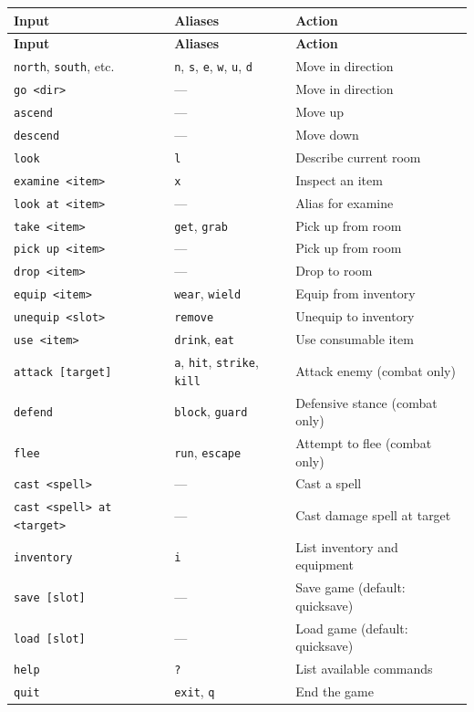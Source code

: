 \documentclass[a4paper,10pt]{article}
\newcommand{\cmd}[1]{\texttt{#1}}
\begin{document}
\begin{longtable}{@{}llp{6cm}@{}}
\toprule
\textbf{Input} & \textbf{Aliases} & \textbf{Action} \\
\midrule
\endfirsthead
\toprule
\textbf{Input} & \textbf{Aliases} & \textbf{Action} \\
\midrule
\endhead
\cmd{north}, \cmd{south}, etc. & \cmd{n}, \cmd{s}, \cmd{e}, \cmd{w}, \cmd{u}, \cmd{d} & Move in direction \\
\cmd{go <dir>}         & ---                        & Move in direction \\
\cmd{ascend}           & ---                        & Move up \\
\cmd{descend}          & ---                        & Move down \\
\cmd{look}             & \cmd{l}                    & Describe current room \\
\cmd{examine <item>}   & \cmd{x}                    & Inspect an item \\
\cmd{look at <item>}   & ---                        & Alias for examine \\
\cmd{take <item>}      & \cmd{get}, \cmd{grab}      & Pick up from room \\
\cmd{pick up <item>}   & ---                        & Pick up from room \\
\cmd{drop <item>}      & ---                        & Drop to room \\
\cmd{equip <item>}     & \cmd{wear}, \cmd{wield}    & Equip from inventory \\
\cmd{unequip <slot>}   & \cmd{remove}               & Unequip to inventory \\
\cmd{use <item>}       & \cmd{drink}, \cmd{eat}     & Use consumable item \\
\cmd{attack [target]}  & \cmd{a}, \cmd{hit}, \cmd{strike}, \cmd{kill} & Attack enemy (combat only) \\
\cmd{defend}           & \cmd{block}, \cmd{guard}   & Defensive stance (combat only) \\
\cmd{flee}             & \cmd{run}, \cmd{escape}    & Attempt to flee (combat only) \\
\cmd{cast <spell>}     & ---                        & Cast a spell \\
\cmd{cast <spell> at <target>} & ---                & Cast damage spell at target \\
\cmd{inventory}        & \cmd{i}                    & List inventory and equipment \\
\cmd{save [slot]}      & ---                        & Save game (default: quicksave) \\
\cmd{load [slot]}      & ---                        & Load game (default: quicksave) \\
\cmd{help}             & \cmd{?}                    & List available commands \\
\cmd{quit}             & \cmd{exit}, \cmd{q}        & End the game \\
\bottomrule
\end{longtable}
\end{document}
